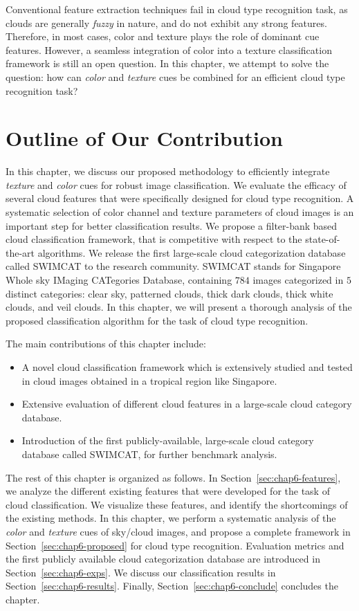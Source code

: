 Conventional feature extraction techniques fail in cloud type recognition task, as clouds are generally \emph{fuzzy} in nature, and do not exhibit any strong features. Therefore, in most cases, color and texture plays the role of dominant cue features. However, a seamless integration of color into a texture classification framework is still an open question. In this chapter, we attempt to solve the question: how can \emph{color} and \emph{texture} cues be combined for an efficient cloud type recognition task?

\section{Outline of Our Contribution}
In this chapter, we discuss our proposed methodology to efficiently integrate \emph{texture} and \emph{color} cues for robust image classification. We evaluate the efficacy of several cloud features that were specifically designed for cloud type recognition. A systematic selection of color channel and texture parameters of cloud images is an important step for better classification results. We propose a filter-bank based cloud classification framework, that is competitive with respect to the state-of-the-art algorithms. We release the first large-scale cloud categorization database called SWIMCAT to the research community. SWIMCAT stands for Singapore Whole sky IMaging CATegories Database, containing $784$ images categorized in $5$ distinct categories: clear sky, patterned clouds, thick dark clouds, thick white clouds, and veil clouds. In this chapter, we will present a thorough analysis of the proposed classification algorithm for the task of cloud type recognition. 

The main contributions of this chapter include: 
\begin{itemize}
\item A novel cloud classification framework which is extensively studied and tested in cloud images obtained in a tropical region like Singapore.
\item Extensive evaluation of different cloud features in a large-scale cloud category database.
\item Introduction of the first publicly-available, large-scale cloud category database called SWIMCAT, for further benchmark analysis.
\end{itemize}


The rest of this chapter is organized as follows. In Section~\ref{sec:chap6-features}, we analyze the different existing features that were developed for the task of cloud classification. We visualize these features, and identify the shortcomings of the existing methods. In this chapter, we perform a systematic analysis of the \emph{color} and \emph{texture} cues of sky/cloud images, and propose a complete framework in Section~\ref{sec:chap6-proposed} for cloud type recognition. Evaluation metrics and the first publicly available cloud categorization database are introduced in Section~\ref{sec:chap6-exps}. We discuss our classification results in Section~\ref{sec:chap6-results}. Finally, Section~\ref{sec:chap6-conclude} concludes the chapter.

